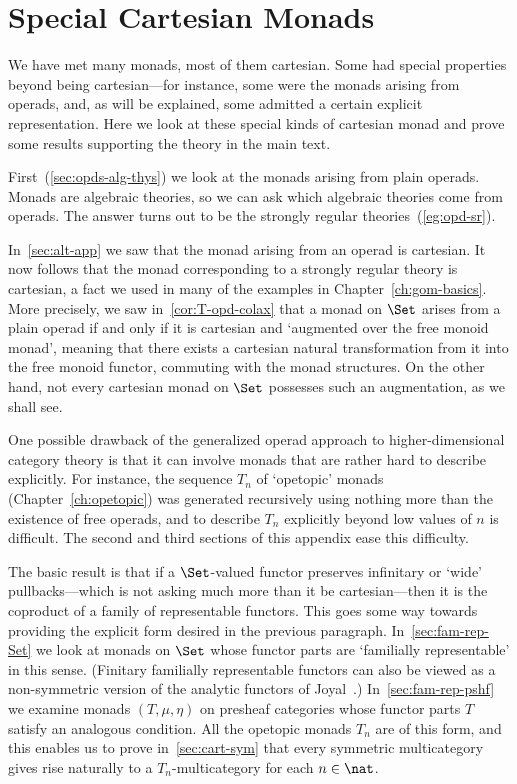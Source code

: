 
\chapter{Special Cartesian Monads}

%
%
%


\noindent
We have met many monads, most of them cartesian.  Some had special
properties beyond being cartesian---for instance, some were the monads
arising from operads, and, as will be explained, some admitted a certain
explicit representation.  Here we look at these special kinds of cartesian
monad and prove some results supporting the theory in the main text.

First~(\ref{sec:opds-alg-thys}) we look at the monads arising from
plain operads.  Monads are algebraic theories, so we can ask which
algebraic theories come from operads.  The answer turns out to be the
strongly regular theories~(\ref{eg:opd-sr}).

In~\ref{sec:alt-app} we saw that the monad arising from an
operad is cartesian.
It now follows that the monad corresponding to a strongly regular theory is
cartesian, a fact we used in many of the examples in
Chapter~\ref{ch:gom-basics}.  More precisely, we saw
in~\ref{cor:T-opd-colax} that a monad on $\Set$ arises from a plain operad
if and only if it is cartesian and `augmented over the free monoid monad',
meaning that there exists a cartesian natural transformation from it into
the free monoid functor, commuting with the monad structures.  On the other
hand, not every cartesian monad on $\Set$ possesses such an augmentation,
as we shall see.

One possible drawback of the generalized operad approach to
higher-dimensional category theory is that it can involve monads that are
rather hard to describe explicitly.  For instance, the sequence $T_n$ of
`opetopic' monads (Chapter~\ref{ch:opetopic}) was generated recursively
using nothing more than the existence of free operads, and to describe
$T_n$ explicitly beyond low values of $n$ is difficult.  The second and
third sections of this appendix ease this difficulty.

The basic result is that if a $\Set$-valued functor preserves infinitary or
`wide' pullbacks---which is not asking much more than it be
cartesian---then it is the coproduct of a family of representable functors.
This goes some way towards providing the explicit form desired in the
previous paragraph.  In~\ref{sec:fam-rep-Set} we look at monads on $\Set$
whose functor parts are `familially representable' in this sense.
(Finitary familially representable functors can also be viewed as a
non-symmetric version of the analytic%
%
%
functors of Joyal~\cite{JoyFAE}.)%
%
%
In~\ref{sec:fam-rep-pshf} we examine monads $(T,\mu,\eta)$ on presheaf
categories whose functor parts $T$ satisfy an analogous condition.  All the
opetopic%
%
%
monads $T_n$ are of this form, and this enables us to prove
in~\ref{sec:cart-sym} that every symmetric multicategory gives rise
naturally to a $T_n$-multicategory for each $n\in\nat$.

